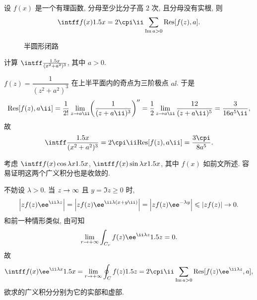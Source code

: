 \begin{theorem}
  \label{thm:rational-integral-infinity}
  设 $f(x)$ 是一个有理函数, 分母至少比分子高 $2$ 次, 且分母没有实根, 则
  \[
     \intff f(x)\d x
    =2\cpi\ii\sum_{\Im a>0}\Res[f(z),a].
  \]
\end{theorem}

\begin{figure}[H]
  \centering
  \caption{半圆形闭路}
  \label{fig:half-circle-contour}
\end{figure}

\begin{example}
  计算 $\intff \frac{\d x}{(x^2+a^2)^3}$, 其中 $a>0$.
\end{example}

\begin{solution}
  $f(z)=\dfrac1{(z^2+a^2)^3}$ 在上半平面内的奇点为三阶极点 $a\ii$.
  于是
  \[
     \Res[f(z),a\ii]
    =\frac1{2!}\lim_{z\ra a\ii}\biggl(\frac1{(z+a\ii)^3}\biggr)''
    =\half\lim_{z\ra a\ii}\frac{12}{(z+a\ii)^5}
    =\frac{3}{16a^5\ii},
  \]
  故
  \[
     \intff \frac{\d x}{(x^2+a^2)^3}
    =2\cpi\ii\Res[f(z),a\ii]
    =\frac{3\cpi}{8a^5}.
  \]
\end{solution}

考虑 $\intff f(x)\cos{\lambda x}\d x$, $\intff f(x)\sin{\lambda x}\d x$, 其中 $f(x)$ 如前文所述.
容易证明这两个广义积分也是收敛的.

不妨设 $\lambda>0$.
当 $z\rightarrow \infty$ 且 $y=\Im z\ge 0$ 时, 
  \[
     \abs{zf(z)\ee^{\ii \lambda z}}
    =\abs{zf(z)\ee^{\ii \lambda (x+y\ii)}}
    =\abs{zf(z)\ee^{-\lambda y}}
    \le \abs{zf(z)}\ra 0.
  \]
和前一种情形类似, 由\thmSA 可知
\[
  \lim_{r\ra +\infty}\int_{C_r}f(z)\ee^{\ii \lambda z}\d z=0.
\]
故
\[
   \intff f(x)\ee^{\ii \lambda x}\d x
  =\lim_{r\ra +\infty}\oint_C f(z)\d z
  =2\cpi\ii\sum_{\Im a>0}\Res[f(z)\ee^{\ii \lambda z},a],
\]
欲求的广义积分分别为它的实部和虚部.

